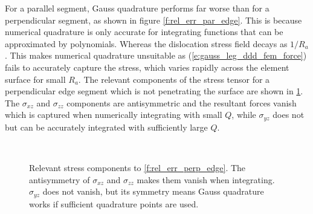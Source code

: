 \documentclass[11pt]{iopart}
\begin{document}
For a parallel segment, Gauss quadrature performs far worse than for a perpendicular segment, as shown in figure \ref{f:rel_err_par_edge}. This is because numerical quadrature is only accurate for integrating functions that can be approximated by polynomials. Whereas the dislocation stress field \cite{Cai2006} decays as $1/R_{a}$. This makes numerical quadrature unsuitable as (\ref{e:gauss_leg_ddd_fem_force}) fails to accurately capture the stress, which varies rapidly across the element surface for small $R_a$. The relevant components of the stress tensor for a perpendicular edge segment which is not penetrating the surface are shown in \cref{f:sigma_perp_edge}. The $\sigma_{xz}$ and $\sigma_{zz}$ components are antisymmetric and the resultant forces vanish which is captured when numerically integrating with small $Q$, while $\sigma_{yz}$ does not but can be accurately integrated with sufficiently large $Q$.

\begin{figure}[t]
    \centering
    ~
    ~
    \caption{Relevant stress components to \cref{f:rel_err_perp_edge}. The antisymmetry of $\sigma_{xz}$ and $\sigma_{zz}$ makes them vanish when integrating. $\sigma_{yz}$ does not vanish, but its symmetry means Gauss quadrature works if sufficient quadrature points are used.}
    \label{f:sigma_perp_edge}
\end{figure}
\end{document}
